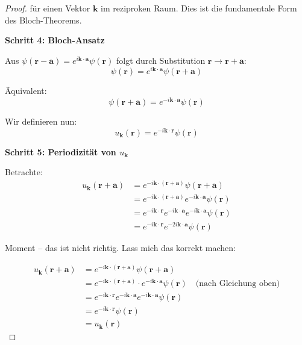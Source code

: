 \documentclass[a4paper,12pt]{article}
\theoremstyle{definition}
\begin{document}
\begin{proof}
	für einen Vektor $\mathbf{k}$ im reziproken Raum. Dies ist die fundamentale Form des Bloch-Theorems.
	
	\textbf{Schritt 4: Bloch-Ansatz}
	
	Aus $\psi(\mathbf{r} - \mathbf{a}) = e^{i \mathbf{k} \cdot \mathbf{a}} \psi(\mathbf{r})$ folgt durch Substitution $\mathbf{r} \to \mathbf{r} + \mathbf{a}$:
	\[
	\psi(\mathbf{r}) = e^{i \mathbf{k} \cdot \mathbf{a}} \psi(\mathbf{r} + \mathbf{a})
	\]
	
	Äquivalent:
	\[
	\psi(\mathbf{r} + \mathbf{a}) = e^{-i \mathbf{k} \cdot \mathbf{a}} \psi(\mathbf{r})
	\]
	
	Wir definieren nun:
	\[
	u_{\mathbf{k}}(\mathbf{r}) = e^{-i \mathbf{k} \cdot \mathbf{r}} \psi(\mathbf{r})
	\]
	
	\textbf{Schritt 5: Periodizität von $u_{\mathbf{k}}$}
	
	Betrachte:
	\begin{align}
		u_{\mathbf{k}}(\mathbf{r} + \mathbf{a}) &= e^{-i \mathbf{k} \cdot (\mathbf{r} + \mathbf{a})} \psi(\mathbf{r} + \mathbf{a}) \\
		&= e^{-i \mathbf{k} \cdot (\mathbf{r} + \mathbf{a})} e^{-i \mathbf{k} \cdot \mathbf{a}} \psi(\mathbf{r}) \\
		&= e^{-i \mathbf{k} \cdot \mathbf{r}} e^{-i \mathbf{k} \cdot \mathbf{a}} e^{-i \mathbf{k} \cdot \mathbf{a}} \psi(\mathbf{r}) \\
		&= e^{-i \mathbf{k} \cdot \mathbf{r}} e^{-2i \mathbf{k} \cdot \mathbf{a}} \psi(\mathbf{r})
	\end{align}
	
	Moment -- das ist nicht richtig. Lass mich das korrekt machen:
	
	\begin{align}
		u_{\mathbf{k}}(\mathbf{r} + \mathbf{a}) &= e^{-i \mathbf{k} \cdot (\mathbf{r} + \mathbf{a})} \psi(\mathbf{r} + \mathbf{a}) \\
		&= e^{-i \mathbf{k} \cdot (\mathbf{r} + \mathbf{a})} \cdot e^{-i \mathbf{k} \cdot \mathbf{a}} \psi(\mathbf{r}) \quad \text{(nach Gleichung oben)}\\
		&= e^{-i \mathbf{k} \cdot \mathbf{r}} e^{-i \mathbf{k} \cdot \mathbf{a}} e^{-i \mathbf{k} \cdot \mathbf{a}} \psi(\mathbf{r}) \\
		&= e^{-i \mathbf{k} \cdot \mathbf{r}} \psi(\mathbf{r})\\
		&= u_{\mathbf{k}}(\mathbf{r})
	\end{align}
	

\end{proof}
\end{document}

